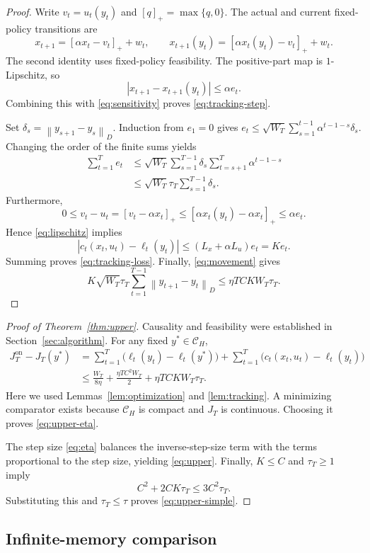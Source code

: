 \documentclass[11pt]{article}
\newcommand{\CH}{\mathcal C_H}
\newcommand{\normD}[1]{\left\lVert #1\right\rVert_D}
\begin{document}
\begin{proof}
Write $v_t=u_t(y_t)$ and $[q]_+=\max\{q,0\}$.
The actual and current fixed-policy transitions are
\[
x_{t+1}=[\alpha x_t-v_t]_++w_t,
\qquad
x_{t+1}(y_t)=[\alpha x_t(y_t)-v_t]_++w_t.
\]
The second identity uses fixed-policy feasibility.
The positive-part map is $1$-Lipschitz, so
\[
|x_{t+1}-x_{t+1}(y_t)|\le\alpha e_t.
\]
Combining this with \eqref{eq:sensitivity} proves
\eqref{eq:tracking-step}.

Set $\delta_s=\normD{y_{s+1}-y_s}$. Induction from $e_1=0$
gives $e_t\le\sqrt{W_T}\sum_{s=1}^{t-1}\alpha^{t-1-s}\delta_s$.
Changing the order of the finite sums yields
\begin{align*}
\sum_{t=1}^T e_t
&\le\sqrt{W_T}\sum_{s=1}^{T-1}\delta_s
       \sum_{t=s+1}^T\alpha^{t-1-s}\\
&\le\sqrt{W_T}\tau_T\sum_{s=1}^{T-1}\delta_s.
\end{align*}
Furthermore,
\[
0\le v_t-u_t
=[v_t-\alpha x_t]_+
\le[\alpha x_t(y_t)-\alpha x_t]_+
\le\alpha e_t.
\]
Hence \eqref{eq:lipschitz} implies
\[
|c_t(x_t,u_t)-\ell_t(y_t)|
\le(L_x+\alpha L_u)e_t=Ke_t.
\]
Summing proves \eqref{eq:tracking-loss}.
Finally, \eqref{eq:movement} gives
\[
K\sqrt{W_T}\tau_T
\sum_{t=1}^{T-1}\normD{y_{t+1}-y_t}
\le\eta TCKW_T\tau_T.
\]
\end{proof}

\begin{proof}[Proof of Theorem~\ref{thm:upper}]
Causality and feasibility were established in
Section~\ref{sec:algorithm}. For any fixed $y^*\in\CH$,
\begin{align*}
J_T^{\mathrm{on}}-J_T(y^*)
&=
\sum_{t=1}^T
\bigl(\ell_t(y_t)-\ell_t(y^*)\bigr)
+
\sum_{t=1}^T
\bigl(c_t(x_t,u_t)-\ell_t(y_t)\bigr)\\
&\le
\frac{W_T}{8\eta}
+\frac{\eta TC^2W_T}{2}
+\eta TCKW_T\tau_T.
\end{align*}
Here we used Lemmas~\ref{lem:optimization} and
\ref{lem:tracking}.
A minimizing comparator exists because $\CH$ is compact and
$J_T$ is continuous. Choosing it proves \eqref{eq:upper-eta}.

The step size \eqref{eq:eta} balances the inverse-step-size
term with the terms proportional to the step size, yielding
\eqref{eq:upper}. Finally, $K\le C$ and $\tau_T\ge1$ imply
\[
C^2+2CK\tau_T\le3C^2\tau_T.
\]
Substituting this and $\tau_T\le\tau$ proves
\eqref{eq:upper-simple}.
\end{proof}

\subsection{Infinite-memory comparison}
\end{document}
